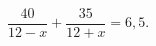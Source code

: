 \begin{ex}[type=equation]
	\begin{condition}
		$\dfrac{40}{12 - x} + \dfrac{35}{12 + x} = 6,5.$
	\end{condition}
\end{ex}